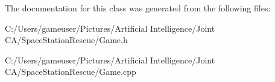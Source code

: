 The documentation for this class was generated from the following files\+:\begin{DoxyCompactItemize}
\item 
C\+:/\+Users/gameuser/\+Pictures/\+Artificial Intelligence/\+Joint C\+A/\+Space\+Station\+Rescue/Game.\+h\item 
C\+:/\+Users/gameuser/\+Pictures/\+Artificial Intelligence/\+Joint C\+A/\+Space\+Station\+Rescue/Game.\+cpp\end{DoxyCompactItemize}
